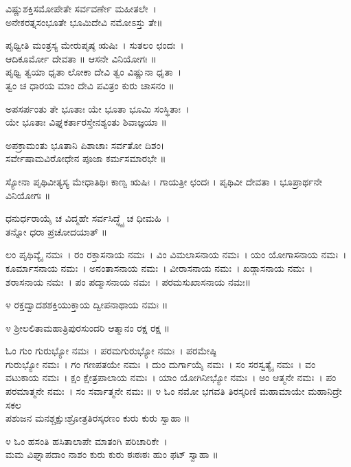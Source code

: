 
ವಿಷ್ಣುಶಕ್ತಿಸಮೋಪೇತೇ ಸರ್ವವರ್ಣೇ ಮಹೀತಲೇ~।\\
ಅನೇಕರತ್ನಸಂಭೂತೇ ಭೂಮಿದೇವಿ ನಮೋಽಸ್ತು ತೇ॥

ಪೃಥ್ವೀತಿ ಮಂತ್ರಸ್ಯ ಮೇರುಪೃಷ್ಠ ಋಷಿಃ~। ಸುತಲಂ ಛಂದಃ~।\\ಆದಿಕೂರ್ಮೋ ದೇವತಾ ॥ ಆಸನೇ ವಿನಿಯೋಗಃ ॥\\
ಪೃಥ್ವಿ ತ್ವಯಾ ಧೃತಾ ಲೋಕಾ ದೇವಿ ತ್ವಂ ವಿಷ್ಣುನಾ ಧೃತಾ~।\\
ತ್ವಂ ಚ ಧಾರಯ ಮಾಂ ದೇವಿ ಪವಿತ್ರಂ ಕುರು ಚಾಸನಂ ॥

ಅಪಸರ್ಪಂತು ತೇ ಭೂತಾಃ ಯೇ ಭೂತಾ ಭೂಮಿ ಸಂಸ್ಥಿತಾಃ~।\\
ಯೇ ಭೂತಾಃ ವಿಘ್ನಕರ್ತಾರಸ್ತೇನಶ್ಯಂತು ಶಿವಾಜ್ಞಯಾ ॥

ಅಪಕ್ರಾಮಂತು ಭೂತಾನಿ ಪಿಶಾಚಾಃ ಸರ್ವತೋ ದಿಶಂ।\\
ಸರ್ವೇಷಾಮವಿರೋಧೇನ ಪೂಜಾ ಕರ್ಮಸಮಾರಭೇ ॥

ಸ್ಯೋನಾ ಪೃಥಿವೀತ್ಯಸ್ಯ ಮೇಧಾತಿಥಿಃ ಕಾಣ್ವ ಋಷಿಃ । ಗಾಯತ್ರೀ ಛಂದಃ । ಪೃಥಿವೀ ದೇವತಾ । ಭೂಪ್ರಾರ್ಥನೇ ವಿನಿಯೋಗಃ ॥\\

ಧನುರ್ಧರಾಯೈ ಚ ವಿದ್ಮಹೇ ಸರ್ವಸಿದ್ಧ್ಯೈ ಚ ಧೀಮಹಿ~।\\ ತನ್ನೋ ಧರಾ ಪ್ರಚೋದಯಾತ್ ॥

ಲಂ ಪೃಥಿವ್ಯೈ ನಮಃ~। ರಂ ರಕ್ತಾಸನಾಯ ನಮಃ~। ವಿಂ ವಿಮಲಾಸನಾಯ ನಮಃ~। ಯಂ ಯೋಗಾಸನಾಯ ನಮಃ~। ಕೂರ್ಮಾಸನಾಯ ನಮಃ~। ಅನಂತಾಸನಾಯ ನಮಃ~। ವೀರಾಸನಾಯ ನಮಃ~। ಖಡ್ಗಾಸನಾಯ ನಮಃ~। ಶರಾಸನಾಯ ನಮಃ~। ಪಂ ಪದ್ಮಾಸನಾಯ ನಮಃ~। ಪರಮಸುಖಾಸನಾಯ ನಮಃ॥

೪ ರಕ್ತದ್ವಾದಶಶಕ್ತಿಯುಕ್ತಾಯ ದ್ವೀಪನಾಥಾಯ ನಮಃ ॥

೪ ಶ್ರೀಲಲಿತಾಮಹಾತ್ರಿಪುರಸುಂದರಿ ಆತ್ಮಾನಂ ರಕ್ಷ ರಕ್ಷ ॥

ಓಂ ಗುಂ ಗುರುಭ್ಯೋ ನಮಃ~। ಪರಮಗುರುಭ್ಯೋ ನಮಃ~। ಪರಮೇಷ್ಠಿ\\ಗುರುಭ್ಯೋ ನಮಃ~। ಗಂ ಗಣಪತಯೇ ನಮಃ~। ದುಂ ದುರ್ಗಾಯೈ ನಮಃ~। ಸಂ ಸರಸ್ವತ್ಯೈ ನಮಃ~। ವಂ ವಟುಕಾಯ ನಮಃ~। ಕ್ಷಂ ಕ್ಷೇತ್ರಪಾಲಾಯ ನಮಃ~। ಯಾಂ ಯೋಗಿನೀಭ್ಯೋ ನಮಃ~। ಅಂ ಆತ್ಮನೇ ನಮಃ~। ಪಂ ಪರಮಾತ್ಮನೇ ನಮಃ~। ಸಂ ಸರ್ವಾತ್ಮನೇ ನಮಃ ॥
\newpage
೪ ಓಂ ನಮೋ ಭಗವತಿ ತಿರಸ್ಕರಿಣಿ ಮಹಾಮಾಯೇ ಮಹಾನಿದ್ರೇ ಸಕಲ \\ಪಶುಜನ ಮನಶ್ಚಕ್ಷುಃಶ್ರೋತ್ರತಿರಸ್ಕರಣಂ ಕುರು ಕುರು ಸ್ವಾಹಾ ॥

೪ ಓಂ ಹಸಂತಿ ಹಸಿತಾಲಾಪೇ ಮಾತಂಗಿ ಪರಿಚಾರಿಕೇ~।\\
ಮಮ ವಿಘ್ನಾಪದಾಂ ನಾಶಂ ಕುರು ಕುರು ಠಃಠಃಠಃ ಹುಂ ಫಟ್ ಸ್ವಾಹಾ ॥

